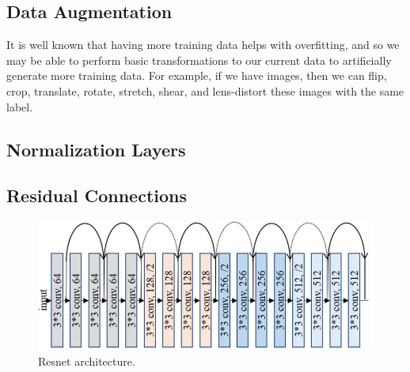 \documentclass{article}
\newenvironment{cverbatim}
    {\SaveVerbatim{cverb}}
    {\endSaveVerbatim
      \flushleft\fboxrule=0pt\fboxsep=.5em
      \colorbox{cverbbg}{%
        \makebox[\dimexpr\linewidth-2\fboxsep][l]{\BUseVerbatim{cverb}}%
      }
      \endflushleft
  }
\begin{document}
%

  \subsection{Data Augmentation}

    It is well known that having more training data helps with overfitting, and so we may be able to perform basic transformations to our current data to artificially generate more training data. For example, if we have images, then we can flip, crop, translate, rotate, stretch, shear, and lens-distort these images with the same label. 

  \subsection{Normalization Layers} 



  \subsection{Residual Connections} 

    \begin{figure}[H]
      \centering 
      \includegraphics[scale=0.4]{img/02_Control/resnet_arch.png}
      \caption{Resnet architecture. } 
      \label{fig:resnet_arch}
    \end{figure}
\end{document}
